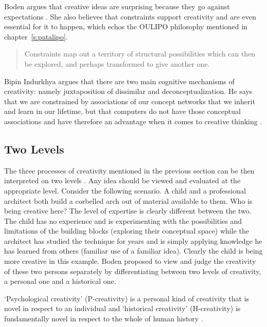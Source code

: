 Boden argues that creative ideas are surprising because they go against expectations \citeyear{Boden2003}. She also believes that constraints support creativity and are even essential for it to happen, which echos the \ac{OULIPO} philosophy mentioned in chapter~\ref{s:patalipo}.

\begin{quotation}
  Constraints map out a territory of structural possibilities which can then be explored, and perhaps transformed to give another one. 
\end{quotation}

Bipin Indurkhya argues that there are two main cognitive mechanisms of creativity: namely juxtaposition of dissimilar and deconceptualization. He says that we are constrained by associations of our concept networks that we inherit and learn in our lifetime, but that computers do not have those conceptual associations and have therefore an advantage when it comes to creative thinking \autocite{Indurkhya}.


\subsection{Two Levels}

The three processes of creativity mentioned in the previous section can be then interpreted on two levels \autocite{Boden2003}. Any idea should be viewed and evaluated at the appropriate level. Consider the following scenario. A child and a professional architect both build a corbelled arch out of material available to them. Who is being creative here? The level of expertise is clearly different between the two. The child has no experience and is experimenting with the possibilities and limitations of the building blocks (exploring their conceptual space) while the architect has studied the technique for years and is simply applying knowledge he has learned from others (familiar use of a familiar idea). Clearly the child is being more creative in this example. Boden proposed to view and judge the creativity of these two persons separately by differentiating between two levels of creativity, a personal one and a historical one. 

`Psychological creativity' (P-creativity) is a personal kind of creativity that is novel in respect to an individual and `historical creativity' (H-creativity) is fundamentally novel in respect to the whole of human history \autocite{Boden2003}. 

